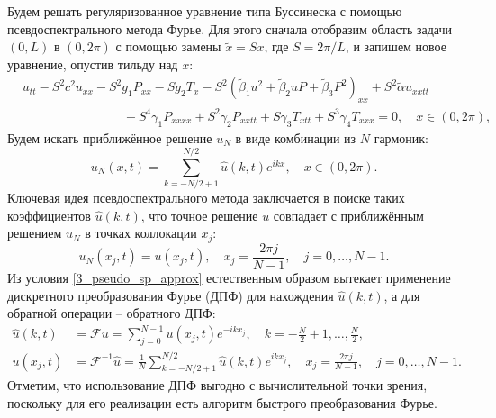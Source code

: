 \documentclass[12pt, a4paper]{report}
\begin{document}
Будем решать регуляризованное уравнение типа Буссинеска с помощью псевдоспектрального метода Фурье. Для этого сначала отобразим область задачи $(0, L)$ в $(0, 2\pi)$ с помощью замены $\tilde x = Sx$, где $S = 2\pi/L$, и запишем новое уравнение, опустив тильду над $x$:
\begin{equation}
\label{3_bq_reg_scaled}
\begin{split}
&u_{tt} - S^2 c^2 u_{xx} - S^2 g_1 P_{xx} - S g_2 T_x - S^2\left(\tilde{\beta}_1 u^2 + \tilde{\beta}_2 u P + \tilde{\beta}_3 P^2\right)_{xx} + S^2\tilde\alpha u_{xxtt}\\
&\qquad\qquad\qquad\qquad + S^4\gamma_1 P_{xxxx} + S^2\gamma_2 P_{xxtt} + S\gamma_3 T_{xtt} + S^3\gamma_4 T_{xxx} = 0, \quad x\in(0, 2\pi),
\end{split}
\end{equation}
Будем искать приближённое решение $u_N$ в виде комбинации из $N$ гармоник:
\begin{equation}\label{3_spect_approx}
u_N(x, t) = \sum_{k=-N/2+1}^{N/2} \widehat u(k, t) e^{ikx}, \quad x\in(0, 2\pi).
\end{equation}
Ключевая идея псевдоспектрального метода заключается в поиске таких коэффициентов $\widehat u(k, t)$, что точное решение $u$ совпадает с приближённым решением $u_N$ в точках коллокации $x_j$:
\begin{equation}\label{3_pseudo_sp_approx}
u_N(x_j, t) = u(x_j, t), \quad x_j = \frac{2\pi j}{N-1}, \quad j=0,\dots, N-1.
\end{equation}
Из условия \eqref{3_pseudo_sp_approx} естественным образом вытекает применение дискретного преобразования Фурье (ДПФ) для нахождения $\widehat u(k, t)$, а для обратной операции -- обратного ДПФ:
\begin{align}\label{3_dft}
\widehat u(k, t) &= \mathcal{F} u = \sum_{j=0}^{N-1} u(x_j, t) e^{-ikx_j}, \quad k=-\frac N 2 + 1, \dots, \frac N 2,\\
\label{3_idft}
u(x_j, t) &= \mathcal{F}^{-1} \widehat u = \frac1N \sum_{k=-N/2+1}^{N/2} \widehat u(k, t) e^{ikx_j}, \quad x_j = \frac{2\pi j}{N-1}, \quad j=0, \dots, N-1.
\end{align}
Отметим, что использование ДПФ выгодно с вычислительной точки зрения, поскольку для его реализации есть алгоритм быстрого преобразования Фурье.
\end{document}
